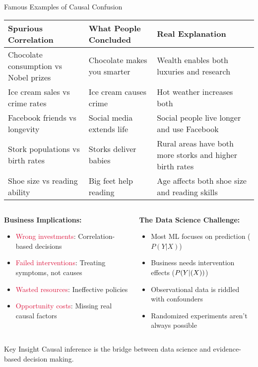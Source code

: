 \documentclass[aspectratio=169,11pt]{beamer}
\begin{document}
\begin{frame}{Famous Examples of Causal Confusion}
\begin{table}
\centering
\small
\begin{tabular}{p{3cm}p{4cm}p{4cm}}
\toprule
\textbf{Spurious Correlation} & \textbf{What People Concluded} & \textbf{Real Explanation} \\
\midrule
Chocolate consumption vs Nobel prizes & Chocolate makes you smarter & Wealth enables both luxuries and research \\
\midrule
Ice cream sales vs crime rates & Ice cream causes crime & Hot weather increases both \\
\midrule
Facebook friends vs longevity & Social media extends life & Social people live longer and use Facebook \\
\midrule
Stork populations vs birth rates & Storks deliver babies & Rural areas have both more storks and higher birth rates \\
\midrule
Shoe size vs reading ability & Big feet help reading & Age affects both shoe size and reading skills \\
\bottomrule
\end{tabular}
\end{table}

\begin{columns}
\begin{column}{0.5\textwidth}
\textbf{Business Implications:}
\begin{itemize}
\item \textcolor{crimson}{Wrong investments}: Correlation-based decisions
\item \textcolor{crimson}{Failed interventions}: Treating symptoms, not causes
\item \textcolor{crimson}{Wasted resources}: Ineffective policies
\item \textcolor{crimson}{Opportunity costs}: Missing real causal factors
\end{itemize}
\end{column}
\begin{column}{0.5\textwidth}
\textbf{The Data Science Challenge:}
\begin{itemize}
\item Most ML focuses on prediction ($P(Y|X)$)
\item Business needs intervention effects ($P(Y|\do(X))$)
\item Observational data is riddled with confounders
\item Randomized experiments aren't always possible
\end{itemize}
\end{column}
\end{columns}

\begin{alertblock}{Key Insight}
Causal inference is the bridge between data science and evidence-based decision making.
\end{alertblock}
\end{frame}
\end{document}
